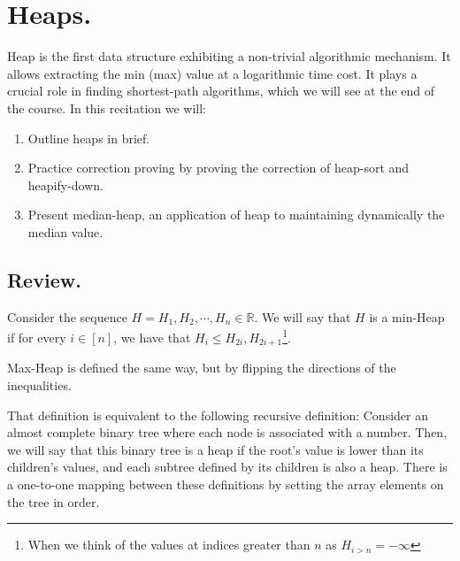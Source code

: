 


\ifdefined\BOOK
\else
\setcounter{chapter}{5}
\fi

\chapter{Heaps.} 
Heap is the first data structure exhibiting a non-trivial algorithmic mechanism. It allows extracting the min (max) value at a logarithmic time cost. It plays a crucial role in finding shortest-path algorithms, which we will see at the end of the course. In this recitation we will: 
\begin{enumerate}
  \item Outline heaps in brief. 
  \item Practice correction proving by proving the correction of heap-sort and heapify-down. 
  \item Present median-heap, an application of heap to maintaining dynamically the median value.
\end{enumerate}

\section{Review.}
  \begin{definition}    
    Consider the sequence $H = H_{1}, H_{2}, \cdots, H_{n} \in \mathbb{R}$. We will say that $H$ is a min-Heap if for every $i \in [n]$, we have that $H_{i} \le H_{2i}, H_{2i + 1}$\footnote{When we think of the values at indices greater than $n$ as $H_{i>n} = -\infty$}.


Max-Heap is defined the same way, but by flipping the directions of the inequalities.
  \end{definition}

That definition is equivalent to the following recursive definition: Consider an almost complete binary tree where each node is associated with a number. Then, we will say that this binary tree is a heap if the root's value is lower than its children's values, and each subtree defined by its children is also a heap. There is a one-to-one mapping between these definitions by setting the array elements on the tree in order.


